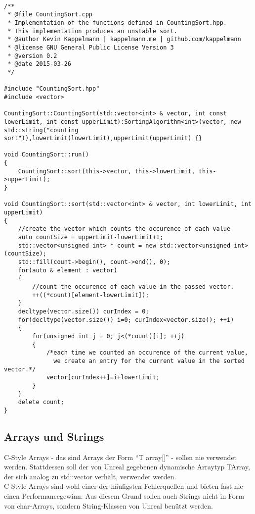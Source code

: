 \documentclass[12pt]{article}
\begin{document}
\begin{lstlisting}

/**
 * @file CountingSort.cpp
 * Implementation of the functions defined in CountingSort.hpp. 
 * This implementation produces an unstable sort.
 * @author Kevin Kappelmann | kappelmann.me | github.com/kappelmann
 * @license GNU General Public License Version 3
 * @version 0.2
 * @date 2015-03-26
 */

#include "CountingSort.hpp"
#include <vector>

CountingSort::CountingSort(std::vector<int> & vector, int const lowerLimit, int const upperLimit):SortingAlgorithm<int>(vector, new std::string("counting sort")),lowerLimit(lowerLimit),upperLimit(upperLimit) {}

void CountingSort::run()
{
	CountingSort::sort(this->vector, this->lowerLimit, this->upperLimit);
}

void CountingSort::sort(std::vector<int> & vector, int lowerLimit, int upperLimit)
{
	//create the vector which counts the occurence of each value
	auto countSize = upperLimit-lowerLimit+1;
	std::vector<unsigned int> * count = new std::vector<unsigned int>(countSize);
	std::fill(count->begin(), count->end(), 0);
	for(auto & element : vector)
	{
		//count the occurence of each value in the passed vector.
		++((*count)[element-lowerLimit]);
	}
	decltype(vector.size()) curIndex = 0;
	for(decltype(vector.size()) i=0; curIndex<vector.size(); ++i)
	{
		for(unsigned int j = 0; j<(*count)[i]; ++j)
		{
			/*each time we counted an occurence of the current value,
			  we create an entry for the current value in the sorted vector.*/
			vector[curIndex++]=i+lowerLimit;
		}
	}
	delete count;
}
\end{lstlisting}



\subsection{Arrays und Strings}
C-Style Arrays - das sind Arrays der Form ``T array[]'' - sollen nie verwendet werden. Stattdessen soll der von Unreal gegebenen dynamische Arraytyp TArray, der sich analog zu std::vector verhält, verwendet werden.\\
C-Style Arrays sind wohl einer der häufigsten Fehlerquellen und bieten fast nie einen Performancegewinn.
Aus diesem Grund sollen auch Strings nicht in Form von char-Arrays, sondern String-Klassen von Unreal benützt werden.
\end{document}
